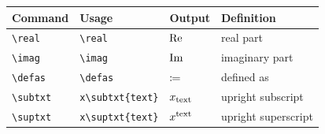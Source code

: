 \documentclass[11pt]{article}
\begin{document}
\begin{tabular}{llll}
    Command        & Usage                 & Output           & Definition          \\
    \hline
    \verb|\real|   & \verb|\real|          & $\operatorname{Re}$          & real part           \\
    \verb|\imag|   & \verb|\imag|          & $\operatorname{Im}$          & imaginary part      \\
    \verb|\defas|  & \verb|\defas|         & $\coloneq$         & defined as          \\
    \verb|\subtxt| & \verb|x\subtxt{text}| & $x_{\mathrm{text}}$ & upright subscript   \\
    \verb|\suptxt| & \verb|x\suptxt{text}| & $x^{\mathrm{text}}$ & upright superscript \\
\end{tabular}
\end{document}
